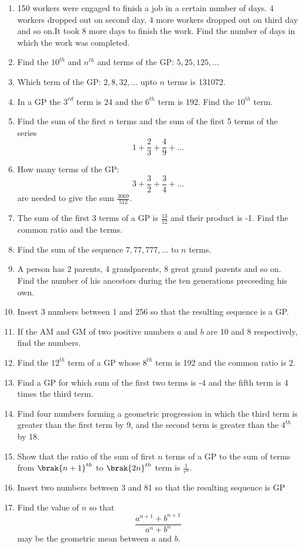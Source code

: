 \begin{enumerate}[label=\thesubsection.\arabic*.,ref=\thesubsection.\theenumi]
\item 150 workers were engaged to finish a job in a certain number of days. 4 workers dropped out on second day,  4 more workers dropped out on third day and so on.It took 8 more days to finish the work. Find the number of days in which the work was completed.
	\item Find the $10^{th}$ and $n^{th}$ and  terms of the GP: $5, 25, 125, \dots$
	\item Which term of the GP: $2, 8, 32, \dots $ upto $n$ terms is 131072.
	\item In a GP the $3^{rd}$ term is 24 and the $6^{th}$ term is 192.  Find the $10^{th}$ term.
	\item Find the sum of the first $n$ terms and the sum of the first 5 terms of the series 
		$$ 1 + \frac{2}{3}+\frac{4}{9}+\dots$$
	\item How many terms of the GP: 
		$$ 3 + \frac{3}{2}+\frac{3}{4}+\dots$$
		are needed to give the sum $\frac{3069}{512}$.
	\item The sum of the first 3 terms of a GP is 
$\frac{13}{12}$ and their product is -1.  Find the common ratio and the terms.
\item Find the sum of the sequence $7, 77, 777, \dots$ to $n$ terms.
\item A person has 2 parents, 4 grandparents, 8 great grand parents and so on.  Find the number of his ancestors during the ten generations preceeding his own.
\item Insert 3 numbers between 1 and 256 so that the resulting sequence is a GP.
\item If the AM and GM of two positive numbers $a$ and $b$ are 10 and 8 respectively, find the numbers.
\item Find the $12^{th}$ term of a GP  whose $8^{th}$ term is 192 and the common ratio is 2.
\item Find a GP  for which sum of the first two terms is -4 and the fifth term is 4 times the third term.
\item Find four numbers forming a geometric progression in which the third term is greater than the first term by 9, and the second term is greater than the $4^{th}$ by 18.
\item Show that the ratio of the sum of first $n$ terms of a GP  to the sum of terms from $\brak{n+1}^{th}$ to $\brak{2n}^{th}$ term is $\frac{1}{r^n}$.
\item Insert two numbers between 3 and 81 so that the resulting sequence is GP 
\item Find the value of $n$ so that $$\frac{a^{n + 1} + b^{n + 1}}{a^n + b^n}$$ may be the geometric mean between $a$ and $b$.

\end{enumerate}
